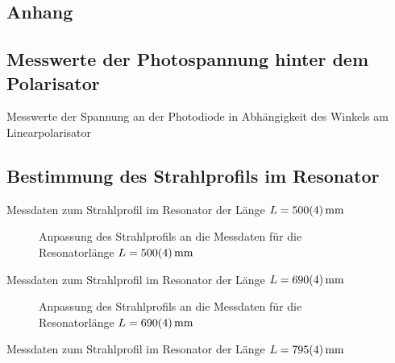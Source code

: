 \documentclass[11pt, a4paper]{article}
\numberwithin{equation}{section}
\begin{document}
\begin{appendix}
\section{Anhang}
\subsection{Messwerte der Photospannung hinter dem Polarisator}
\begin{table}[h]
	\centering
	
	\caption{Messwerte der Spannung an der Photodiode in Abhängigkeit des Winkels am Linearpolarisator}
	\label{tab:malus}
\end{table}
\clearpage

\subsection{Bestimmung des Strahlprofils im Resonator}
\label{app:strahlprofil}
\FloatBarrier
\begin{table}[t]
	\centering
	
	\caption{Messdaten zum Strahlprofil im Resonator der Länge $L = \SI{500 +- 4}{\milli\metre}$}
	\label{tab:strahlradius_50}
\end{table}
\begin{figure}[b]
	\centering
	
	\caption{Anpassung des Strahlprofils an die Messdaten für die Resonatorlänge $L = \SI{500 +- 4}{\milli\metre}$}
	\label{fig:strahlradius_50}
\end{figure}
\clearpage
\begin{table}[t]
	\centering
	
	\caption{Messdaten zum Strahlprofil im Resonator der Länge $L = \SI{690 +- 4}{\milli\metre}$}
	\label{tab:strahlradius_70}
\end{table}
\begin{figure}[b]
	\centering
	
	\caption{Anpassung des Strahlprofils an die Messdaten für die Resonatorlänge $L = \SI{690 +- 4}{\milli\metre}$}
	\label{fig:strahlradius_70}
\end{figure}
\clearpage
\begin{table}[t]
	\centering
	
	\caption{Messdaten zum Strahlprofil im Resonator der Länge $L = \SI{795 +- 4}{\milli\metre}$}
	\label{tab:strahlradius_80}
\end{table}
\begin{figure}[b]

\end{figure}
\end{appendix}
\end{document}
